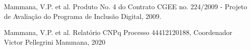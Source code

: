 \documentclass[
12pt,		%
openright,	%
twoside,  %
a4paper,			%
chapter=TITLE,		%
english,			%
french,				%
spanish,			%
brazil				%
]{USPSC-classe/USPSC}
\begin{document}
\begin{flushleft}
\begin{flushleft}
\begin{flushleft}
\begin{flushleft}
\begin{flushleft}
\begin{flushleft}
\begin{flushleft}
\begin{flushleft}
[CGEE, 2010a] Mammana, V.P. et al. Produto No. 4 do Contrato CGEE no. 224/2009 - Projeto de Avalia\c{c}\~ao do Programa de Inclus\~ao Digital, 2009.
\end{flushleft}


\end{flushleft}


\end{flushleft}


\end{flushleft}


\end{flushleft}


\end{flushleft}


\end{flushleft}


\end{flushleft}


\begin{flushleft}
\begin{flushleft}
\begin{flushleft}
\begin{flushleft}
\begin{flushleft}
\begin{flushleft}
\begin{flushleft}
\begin{flushleft}
[CNPq, 2020a] Mammana, V.P. et al. Relat\'orio CNPq Processo 44412120188, Coordenador Victor Pellegrini Mammana, 2020
\end{flushleft}


\end{flushleft}


\end{flushleft}


\end{flushleft}


\end{flushleft}


\end{flushleft}


\end{flushleft}


\end{flushleft}
\end{document}
